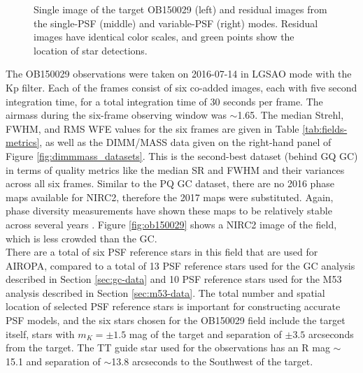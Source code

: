 \documentclass[]{spie}  %
\begin{document}
\begin{figure}[!h]
 \caption{\footnotesize Single image of the target OB150029 (left) and residual images from the single-PSF (middle) and variable-PSF (right) modes. Residual images have identical color scales, and green points show the location of star detections.} \label{fig:ob150029-targ-res}
\end{figure}

The OB150029 observations were taken on 2016-07-14 in LGSAO mode with the Kp filter. Each of the frames consist of six co-added images, each with five second integration time, for a total integration time of 30 seconds per frame. The airmass during the six-frame observing window was $\sim$1.65. The median Strehl, FWHM, and RMS WFE values for the six frames are given in Table \ref{tab:fields-metrics}, as well as the DIMM/MASS data given on the right-hand panel of Figure \ref{fig:dimmmass_datasets}. This is the second-best dataset (behind GQ GC) in terms of quality metrics like the median SR and FWHM and their variances across all six frames. Similar to the PQ GC dataset, there are no 2016 phase maps available for NIRC2, therefore the 2017 maps were substituted. Again, phase diversity measurements have shown these maps to be relatively stable across several years \citep{Ciurlo:inprep}. Figure \ref{fig:ob150029} shows a NIRC2 image of the field, which is less crowded than the GC. 
\\
\indent There are a total of six PSF reference stars in this field that are used for AIROPA, compared to a total of 13 PSF reference stars used for the GC analysis described in Section \ref{sec:gc-data} and 10 PSF reference stars used for the M53 analysis described in Section \ref{sec:m53-data}. The total number and spatial location of selected PSF reference stars is important for constructing accurate PSF models, and the six stars chosen for the OB150029 field include the target itself, stars with $m_K = \pm 1.5$ mag of the target and separation of $\pm3.5$ arcseconds from the target. The TT guide star used for the observations has an R mag ${\sim}$15.1 and separation of ${\sim}$13.8 arcseconds to the Southwest of the target.
\end{document}
